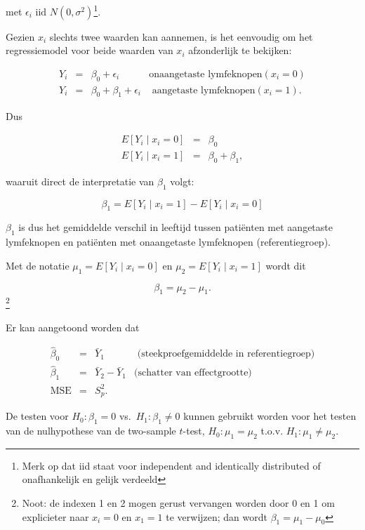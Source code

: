 \documentclass[
  12pt,dutch]{book}
\theoremstyle{definition}
\theoremstyle{definition}
\theoremstyle{definition}
\theoremstyle{definition}
\theoremstyle{remark}
\begin{document}
met \(\epsilon_i \text{ iid } N(0,\sigma^2)\)\footnote{Merk op dat iid staat voor independent and identically distributed of onafhankelijk en gelijk verdeeld}.

Gezien \(x_i\) slechts twee waarden kan aannemen, is het eenvoudig om het regressiemodel voor beide waarden van \(x_i\) afzonderlijk te bekijken:

\[\begin{array}{lcll}
   Y_i &=& \beta_0 +\epsilon_i &\text{onaangetaste lymfeknopen} (x_i=0) \\
   Y_i &=& \beta_0 + \beta_1 +\epsilon_i &\text{ aangetaste lymfeknopen} (x_i=1) .
 \end{array}\]

Dus

\begin{eqnarray*}
   E\left[Y_i\mid x_i=0\right] &=& \beta_0 \\
   E\left[Y_i\mid x_i=1\right] &=& \beta_0 + \beta_1,
\end{eqnarray*}

waaruit direct de interpretatie van \(\beta_1\) volgt:

\[   \beta_1 = E\left[Y_i\mid x_i=1\right]-E\left[Y_i\mid x_i=0\right]\]

\(\beta_1\) is dus het gemiddelde verschil in leeftijd tussen patiënten met aangetaste lymfeknopen en patiënten met onaangetaste lymfeknopen (referentiegroep).

Met de notatie \(\mu_1= E\left[Y_i\mid x_i=0\right]\) en \(\mu_2= E\left[Y_i\mid x_i=1\right]\) wordt dit

\[\beta_1 = \mu_2-\mu_1.\]\footnote{Noot: de indexen 1 en 2 mogen gerust vervangen worden door 0 en 1 om explicieter naar \(x_i=0\) en \(x_1=1\) te verwijzen; dan wordt \(\beta_1=\mu_1-\mu_0\)}

Er kan aangetoond worden dat

\[\begin{array}{ccll}
 \hat\beta_0
   &=& \bar{Y}_1&\text{ (steekproefgemiddelde in referentiegroep)} \\
 \hat\beta_1
   &=& \bar{Y}_2-\bar{Y}_1&\text{(schatter van effectgrootte)} \\
 \text{MSE}
   &=& S_p^2 .
\end{array}\]

De testen voor \(H_0:\beta_1=0\) vs.~\(H_1:\beta_1\neq0\) kunnen gebruikt worden voor het testen van de nulhypothese van de two-sample \(t\)-test, \(H_0:\mu_1=\mu_2\) t.o.v. \(H_1:\mu_1\neq\mu_2\).
\end{document}
